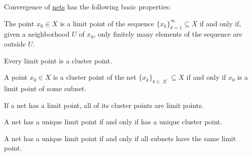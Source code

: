 \begin{proposition}\label{thm:def:net_convergence/properties}
  Convergence of \hyperref[def:net_convergence]{nets} has the following basic properties:

  \begin{thmenum}
     The point \( x_0 \in X \) is a limit point of the sequence \( \{ x_k \}_{k=1}^\infty \subseteq X \) if and only if, given a neighborhood \( U \) of \( x_0 \), only finitely many elements of the sequence are outside \( U \).

     Every limit point is a cluster point.

     A point \( x_0 \in X \) is a cluster point of the net \( \{ x_k \}_{k \in \mscrK} \subseteq X \) if and only if \( x_0 \) is a limit point of some subnet.

     If a net has a limit point, all of its cluster points are limit points.

     A net has a unique limit point if and only if has a unique cluster point.

     A net has a unique limit point if and only if all subnets have the same limit point.
  \end{thmenum}
\end{proposition}
